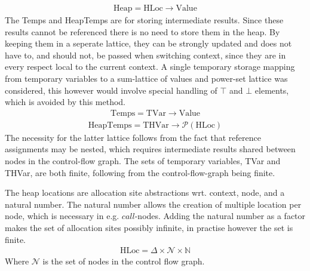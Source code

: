 \begin{align}
\text{Heap} = \text{HLoc} \rightarrow \text{Value}
\end{align}
The { Temps} and { HeapTemps} are for storing intermediate results. Since these results cannot be referenced there is no need to store them in the heap. By keeping them in a seperate lattice, they can be strongly updated and does not have to, and should not, be passed when switching context, since they are in every respect local to the current context. A single temporary storage mapping from temporary variables to a sum-lattice of values and power-set lattice was considered, this however would involve special handling of $\top$ and $\bot$ elements, which is avoided by this method. 
\begin{align}
\text{Temps} = \text{TVar} \rightarrow \text{Value}
\end{align}
\begin{align}
\text{HeapTemps} = \text{THVar} \rightarrow \mathcal{P}(\text{HLoc})
\end{align}
The necessity for the latter lattice follows from the fact that reference assignments may be nested, which requires intermediate results shared between nodes in the control-flow graph. The sets of temporary variables, { TVar} and { THVar}, are both finite, following from the control-flow-graph being finite.

The heap locations are allocation site abstractions wrt. context, node, and a natural number. The natural number allows the creation of multiple location per node, which is necessary in e.g. $\mathit{call}$-nodes. Adding the natural number as a factor makes the set of allocation sites possibly infinite, in practise however the set is finite. 
\begin{align}
\text{HLoc}  = \Delta \times \mathcal{N} \times \mathbb{N}
\end{align}
Where $\mathcal{N}$ is the set of nodes in the control flow graph. 

